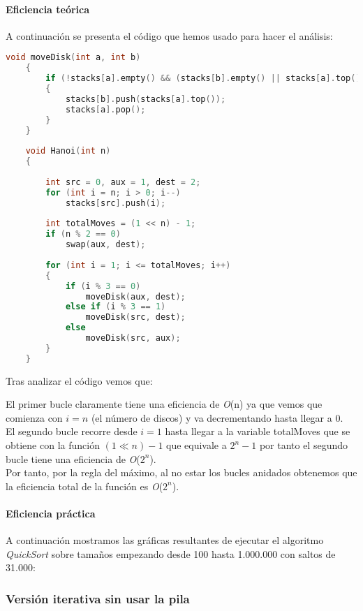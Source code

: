 \documentclass[a4paper,12pt]{article} %
\begin{document}
\paragraph{Eficiencia teórica}

A continuación se presenta el código que hemos usado para hacer el análisis:

\begin{lstlisting}[language=C, caption={Código de Hanoi Iterativo con pila}]
	void moveDisk(int a, int b)
	{
		if (!stacks[a].empty() && (stacks[b].empty() || stacks[a].top() < stacks[b].top()))
		{
			stacks[b].push(stacks[a].top());
			stacks[a].pop();
		}
	}
	 
	void Hanoi(int n)
	{
	 
		int src = 0, aux = 1, dest = 2;
		for (int i = n; i > 0; i--)
			stacks[src].push(i);
	 
		int totalMoves = (1 << n) - 1;
		if (n % 2 == 0)
			swap(aux, dest);
	 
		for (int i = 1; i <= totalMoves; i++)
		{
			if (i % 3 == 0)
				moveDisk(aux, dest);
			else if (i % 3 == 1)
				moveDisk(src, dest);
			else
				moveDisk(src, aux);
		}
	}
\end{lstlisting}

Tras analizar el código vemos que:

El primer bucle claramente tiene una eficiencia de \textit{O}(n) ya que vemos que comienza con $i=n$ (el número de discos)
y va decrementando hasta llegar a 0.\\

El segundo bucle recorre desde $i=1$ hasta llegar a la variable totalMoves que se obtiene con la función 
$(1 \ll n) - 1$ que equivale a $2^n - 1$ por tanto el segundo bucle tiene una eficiencia de \textit{O}($2^n$).\\

Por tanto, por la regla del máximo, al no estar los bucles anidados obtenemos que la eficiencia total de la función es \textit{O}($2^n$).\\

\paragraph{Eficiencia práctica}

A continuación mostramos las gráficas resultantes de ejecutar el algoritmo \textit{QuickSort} 
sobre tamaños empezando desde 100 hasta 1.000.000 con saltos de 31.000:

\subsubsection{Versión iterativa sin usar la pila}
\end{document}
